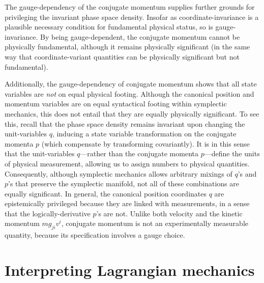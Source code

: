 \documentclass[12pt, english, twoside]{article} %
\begin{document}
The gauge-dependency of the conjugate momentum supplies further grounds for privileging the invariant phase space density. Insofar as coordinate-invariance is a plausible necessary condition for fundamental physical status, so is gauge-invariance. By being gauge-dependent, the conjugate momentum cannot be physically fundamental, although it remains physically significant (in the same way that coordinate-variant quantities can be physically significant but not fundamental).

Additionally, the gauge-dependency of conjugate momentum shows that all state variables are \textit{not} on equal physical footing. Although the canonical position and momentum variables are on equal syntactical footing within symplectic mechanics, this does not entail that they are equally physically significant. To see this, recall that the phase space density remains invariant upon changing the unit-variables $q$, inducing a state variable transformation on the conjugate momenta $p$ (which compensate by transforming covariantly). It is in this sense that the unit-variables $q$---rather than the conjugate momenta $p$---define the units of physical measurement, allowing us to assign numbers to physical quantities. Consequently, although symplectic mechanics allows arbitrary mixings of $q$'s and $p$'s that preserve the symplectic manifold, not all of these combinations are equally significant. In general, the canonical position coordinates $q$ are epistemically privileged because they are linked with measurements, in a sense that the logically-derivative $p$'s are not. Unlike both velocity and the kinetic momentum $m g_{ji} v^i$, conjugate momentum is not an experimentally measurable quantity, because its specification involves a gauge choice.



\section{Interpreting Lagrangian mechanics}
\label{Lagrangian}
\end{document}
